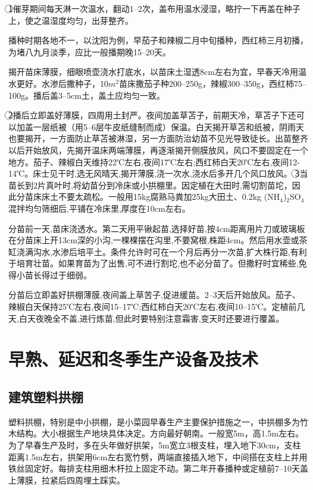 \documentclass{ctexbook}
\begin{document}
\textcircled{1}催芽期间每天淋一次温水，翻动1--2次，盖布用温水浸湿，略拧一下再盖在种子上，使之温湿度均匀，出芽整齐。

播种时期各地不一，以沈阳为例，早茄子和辣椒二月中旬播种，西红柿三月初播，为堵八九月淡季，应比一般播期晚15--20天。

揭开苗床薄膜，细眼喷壶浇水打底水，以苗床土湿透8cm左右为宜，早春天冷用温水更好。水渗后撒种子，10$m^{2}$苗床撒茄子种200--250g，辣椒300--350g，西红柿75--100g。播后盖3--5cm土，盖土应均匀一致。

\textcircled{2}播后立即盖好薄膜，四周用土封严。夜间加盖草苫子，前期天冷，草苫子下还可以加盖一层纸被（用5--6层牛皮纸缝制而成）保温。白天揭开草苫和纸被，阴雨天也要揭开，一方面防止草苫被淋湿，另一方面防治幼苗不见光导致徒长。出苗整齐以后开始放风，先揭开温床两端薄膜，再逐渐揭开侧膜放风，风口不要固定在一个地方。茄子、辣椒白天维持22℃左右,夜间17℃左右;西红柿白天20℃左右,夜间12-14℃。床士见干时,选无风晴天,揭开薄膜,浇一次水,浇水后多开几个风口放风。
\textcircled{3}当苗长到2片真叶时,将幼苗分到冷床或小拱棚里。因定植在大田时,需切割苗坨，因此分苗床床土不要太疏松。一般用15kg腐熟马粪加25kg大田土、0.2kg (NH$_4$)$_2$SO$_4$混拌均匀筛细后,平铺在冷床里,厚度在10cm左右。

分苗前一天,苗床浇透水。第二天用平锹起苗,选择好苗,按4cm距离用片刀或玻璃板在分苗床上开13cm深的小沟,一棵棵摆在沟里,不要窝根,株距4cm。然后用水壶或茶缸浇满沟水,水渗后培平土。条件允许时可在一个月后再分一次苗,扩大株行距,有利于培育壮苗。如果育苗为了出售,可不进行割坨,也不必分苗了。但撒籽时宜稀些,免得小苗长得过于细弱。

分苗后立即盖好拱棚薄膜,夜间盖上草苦子,促进缓苗。2--3天后开始放风。茄子、辣椒白天保持25℃左右,夜间15--17℃;西红柿白天20℃左右,夜间10--15℃。定植前几天,白天夜晚全不盖,进行炼苗,但此时要特别注意霜害,变天时还要进行覆盖。

\section{早熟、延迟和冬季生产设备及技术}
\subsection{建筑塑料拱棚}
塑料拱棚，特别是中小拱棚，是小菜园早春生产主要保护措施之一，中拱棚多为竹木结构。大小根据生产地块具体决定。方向最好朝南。一般宽5m，高1.5m左右。为了早春生产及时，多在头年做好拱架，5m宽立3根支柱，埋入地下30cm，支柱距离1.5m左右，拱架用6cm左右宽竹劈，两端直接插入地下，中间搭在支柱上并用铁丝固定好。每排支柱用细木杆拉上固定不动。第二年开春播种或定植前7--10天盖上薄膜，拉紧后四周埋土踩实。
\end{document}
